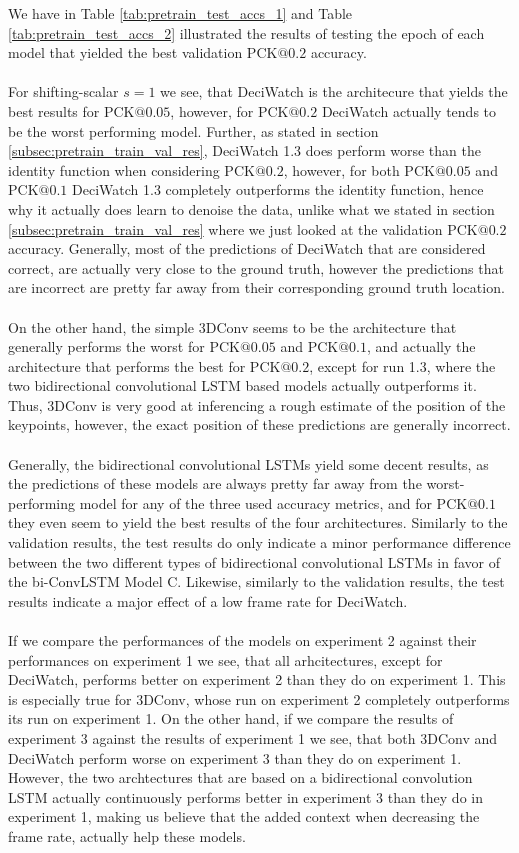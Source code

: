 \documentclass[./main.tex]{subfiles}
\begin{document}
\noindent We have in Table \ref{tab:pretrain_test_accs_1} and Table \ref{tab:pretrain_test_accs_2} illustrated the results of testing the epoch of each model that yielded the best validation PCK$@0.2$ accuracy.
\\
\\
For shifting-scalar $s = 1$ we see, that DeciWatch is the architecure that yields the best results for PCK$@0.05$, however, for PCK$@0.2$ DeciWatch actually tends to be the worst performing model. Further, as stated in section \ref{subsec:pretrain_train_val_res}, DeciWatch 1.3 does perform worse than the identity function when considering PCK$@0.2$, however, for both PCK$@0.05$ and PCK$@0.1$ DeciWatch 1.3 completely outperforms the identity function, hence why it actually does learn to denoise the data, unlike what we stated in section \ref{subsec:pretrain_train_val_res} where we just looked at the validation PCK$@0.2$ accuracy. Generally, most of the predictions of DeciWatch that are considered correct, are actually very close to the ground truth, however the predictions that are incorrect are pretty far away from their corresponding ground truth location.
\\
\\
On the other hand, the simple 3DConv seems to be the architecture that generally performs the worst for PCK$@0.05$ and PCK$@0.1$, and actually the architecture that performs the best for PCK$@0.2$, except for run 1.3, where the two bidirectional convolutional LSTM based models actually outperforms it. Thus, 3DConv is very good at inferencing a rough estimate of the position of the keypoints, however, the exact position of these predictions are generally incorrect.
\\
\\
Generally, the bidirectional convolutional LSTMs yield some decent results, as the predictions of these models are always pretty far away from the worst-performing model for any of the three used accuracy metrics, and for PCK$@0.1$ they even seem to yield the best results of the four architectures. Similarly to the validation results, the test results do only indicate a minor performance difference between the two different types of bidirectional convolutional LSTMs in favor of the bi-ConvLSTM Model C. Likewise, similarly to the validation results, the test results indicate a major effect of a low frame rate for DeciWatch. 
\\
\\
If we compare the performances of the models on experiment 2 against their performances on experiment 1 we see, that all arhcitectures, except for DeciWatch, performs better on experiment 2 than they do on experiment 1. This is especially true for 3DConv, whose run on experiment 2 completely outperforms its run on experiment 1. On the other hand, if we compare the results of experiment 3 against the results of experiment 1 we see, that both 3DConv and DeciWatch perform worse on experiment 3 than they do on experiment 1. However, the two archtectures that are based on a bidirectional convolution LSTM actually continuously performs better in experiment 3 than they do in experiment 1, making us believe that the added context when decreasing the frame rate, actually help these models.
\end{document}
